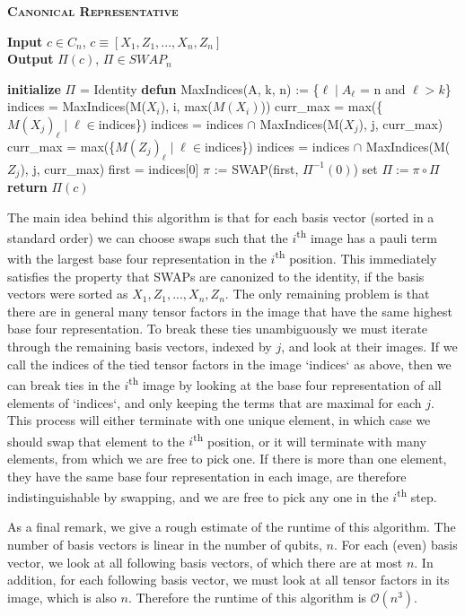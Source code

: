 \begin{algorithm}[H]
\caption*{\textsc{\textbf{Canonical Representative}}}
\hspace*{\algorithmicindent} \textbf{Input} $c\in C_n$, $c\equiv[X_1, Z_1, ..., X_n, Z_n]$\\
\hspace*{\algorithmicindent} \textbf{Output} $\Pi(c)$, $\Pi\in SWAP_n$\\
\begin{algorithmic}
\State \textbf{initialize} $\Pi$ = Identity
    \State \textbf{defun} MaxIndices(A, k, n) := \{$\ell\mid A_\ell$ = n and $\ell >k$\}
    \State indices = MaxIndices(M($X_i$), i, max($M(X_i)$))
        \State curr\_max = max(\{$M(X_j)_\ell\mid\ell\in$indices\})
        \State indices = indices $\cap$ MaxIndices(M($X_j$), j, curr\_max)
        \State curr\_max = max(\{$M(Z_j)_\ell\mid\ell\in$indices\})
        \State indices = indices $\cap$ MaxIndices(M($Z_j$), j, curr\_max)
    \EndFor
    \State first = indices[0]
    \State $\pi$ := SWAP(first, $\Pi^{-1}(0)$)
    \State set $\Pi := \pi\circ\Pi$
\EndFor
\State  \textbf{return} $\Pi(c)$

\end{algorithmic}
\end{algorithm}


The main idea behind this algorithm is that for each basis vector (sorted in a standard order) we can choose swaps such that the $i$\textsuperscript{th} image has a pauli term with the largest base four representation in the $i$\textsuperscript{th} position. This immediately satisfies the property that SWAPs are canonized to the identity, if the basis vectors were sorted as $X_1, Z_1, ..., X_n, Z_n$. The only remaining problem is that there are in general many tensor factors in the image that have the same highest base four representation. To break these ties unambiguously we must iterate through the remaining basis vectors, indexed by $j$, and look at their images. If we call the indices of the tied tensor factors in the image `indices` as above, then we can break ties in the $i$\textsuperscript{th} image by looking at the base four representation of all elements of `indices`, and only keeping the terms that are maximal for each $j$. This process will either terminate with one unique element, in which case we should swap that element to the $i$\textsuperscript{th} position, or it will terminate with many elements, from which we are free to pick one. If there is more than one element, they have the same base four representation in each image, are therefore indistinguishable by swapping, and we are free to pick any one in the $i$\textsuperscript{th} step.

As a final remark, we give a rough estimate of the runtime of this algorithm. The number of basis vectors is linear in the number of qubits, $n$. For each (even) basis vector, we look at all following basis vectors, of which there are at most $n$. In addition, for each following basis vector, we must look at all tensor factors in its image, which is also $n$. Therefore the runtime of this algorithm is $\mathcal{O}(n^3)$.
